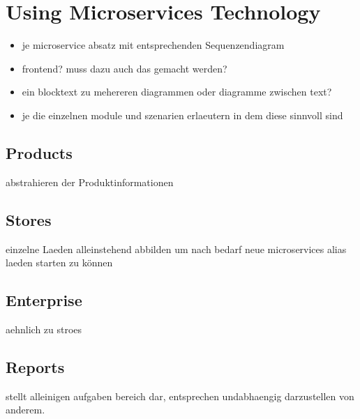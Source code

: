 	

	
\section{Using Microservices Technology} \label{MS}
	\begin{itemize}
		\item je microservice absatz mit entsprechenden Sequenzendiagram %
		\item frontend? muss dazu auch das gemacht werden?
		\item ein blocktext zu mehereren diagrammen oder diagramme zwischen text?
		
	
			\item je die einzelnen module und szenarien erlaeutern in dem diese sinnvoll sind
	\end{itemize}
	
		\subsection{Products}
		abstrahieren der Produktinformationen 
		
		\subsection{Stores}
		einzelne Laeden alleinstehend abbilden um nach bedarf neue microservices alias laeden starten zu können
		
		\subsection{Enterprise}
		aehnlich zu stroes
		
		\subsection{Reports}
		stellt alleinigen aufgaben bereich dar, entsprechen undabhaengig darzustellen von anderem.


